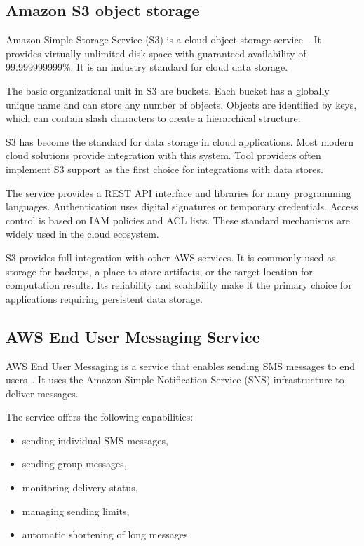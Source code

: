 \subsection{Amazon S3 object storage}\label{subsec:amazon-s3-object-storage}

Amazon Simple Storage Service (S3) is a cloud object storage service~\cite{aws_s3}.
It provides virtually unlimited disk space with guaranteed availability of 99.999999999\%.
It is an industry standard for cloud data storage.

The basic organizational unit in S3 are buckets.
Each bucket has a globally unique name and can store any number of objects.
Objects are identified by keys, which can contain slash characters to create a hierarchical structure.

S3 has become the standard for data storage in cloud applications.
Most modern cloud solutions provide integration with this system.
Tool providers often implement S3 support as the first choice for integrations with data stores.

The service provides a REST API interface and libraries for many programming languages.
Authentication uses digital signatures or temporary credentials.
Access control is based on IAM policies and ACL lists.
These standard mechanisms are widely used in the cloud ecosystem.

S3 provides full integration with other AWS services.
It is commonly used as storage for backups, a place to store artifacts, or the target location for computation results.
Its reliability and scalability make it the primary choice for applications requiring persistent data storage.

\subsection{AWS End User Messaging Service}\label{subsec:amazon-sns}

AWS End User Messaging is a service that enables sending SMS messages to end users~\cite{aws_messaging}.
It uses the Amazon Simple Notification Service (SNS) infrastructure to deliver messages.

The service offers the following capabilities:
\begin{itemize}
    \item sending individual SMS messages,
    \item sending group messages,
    \item monitoring delivery status,
    \item managing sending limits,
    \item automatic shortening of long messages.
\end{itemize}

